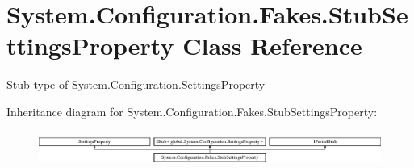 \hypertarget{class_system_1_1_configuration_1_1_fakes_1_1_stub_settings_property}{\section{System.\-Configuration.\-Fakes.\-Stub\-Settings\-Property Class Reference}
\label{class_system_1_1_configuration_1_1_fakes_1_1_stub_settings_property}
}


Stub type of System.\-Configuration.\-Settings\-Property 


Inheritance diagram for System.\-Configuration.\-Fakes.\-Stub\-Settings\-Property\-:\begin{figure}[H]
\begin{center}
\leavevmode
\includegraphics[height=1.141692cm]{class_system_1_1_configuration_1_1_fakes_1_1_stub_settings_property}
\end{center}
\end{figure}
